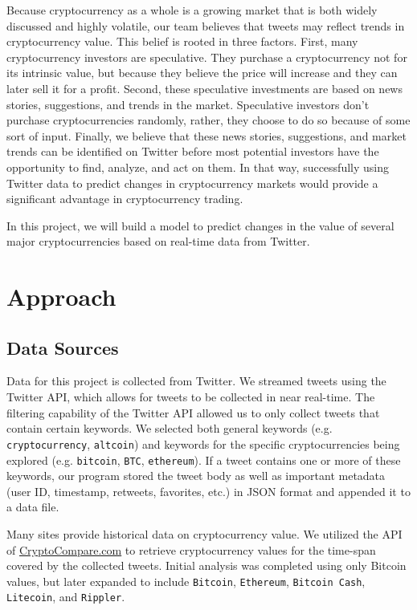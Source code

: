 \documentclass[sigconf]{acmart}
\newcommand{\code}{\texttt}
\begin{document}
Because cryptocurrency as a whole is a growing market that is both widely discussed and highly volatile, our team believes that tweets may reflect trends in cryptocurrency value. This belief is rooted in three factors. First, many cryptocurrency investors are speculative. They purchase a cryptocurrency not for its intrinsic value, but because they believe the price will increase and they can later sell it for a profit. Second, these speculative investments are based on news stories, suggestions, and trends in the market. Speculative investors don't purchase cryptocurrencies randomly, rather, they choose to do so because of some sort of input. Finally, we believe that these news stories, suggestions, and market trends can be identified on Twitter before most potential investors have the opportunity to find, analyze, and act on them. In that way, successfully using Twitter data to predict changes in cryptocurrency markets would provide a significant advantage in cryptocurrency trading. 

In this project, we will build a model to predict changes in the value of several major cryptocurrencies based on real-time data from Twitter.


\section{Approach}

\subsection{Data Sources}
Data for this project is collected from Twitter. We streamed tweets using the Twitter API, which allows for tweets to be collected in near real-time. The filtering capability of the Twitter API allowed us to only collect tweets that contain certain keywords. We selected both general keywords (e.g. \code{cryptocurrency}, \code{altcoin}) and keywords for the specific cryptocurrencies being explored (e.g. \code{bitcoin}, \code{BTC}, \code{ethereum}). If a tweet contains one or more of these keywords, our program stored the tweet body as well as important metadata (user ID, timestamp, retweets, favorites, etc.) in JSON format and appended it to a data file.

Many sites provide historical data on cryptocurrency value. We utilized the API of \href{https://www.cryptocompare.com}{CryptoCompare.com} to retrieve cryptocurrency values for the time-span covered by the collected tweets. Initial analysis was completed using only Bitcoin values, but later expanded to include \code{Bitcoin}, \code{Ethereum}, \code{Bitcoin Cash}, \code{Litecoin}, and \code{Rippler}.
\end{document}
